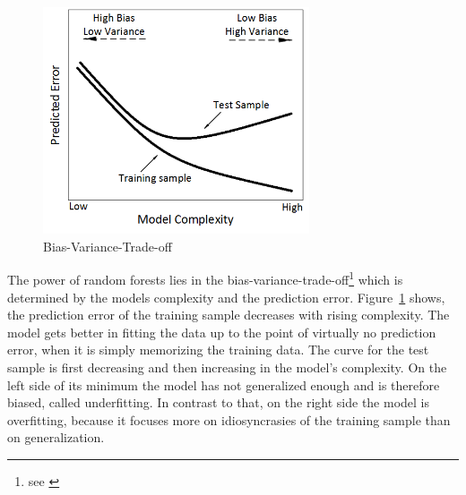 \documentclass[12pt, a4paper, abstract, parskip]{scrartcl}
\theoremstyle{definition}
\begin{document}
\begin{figure}[!ht]
	\centering
	\includegraphics[width=0.7\textwidth]{graphics/biasvariancetradeoff.png}
	\caption{Bias-Variance-Trade-off}
	\label{fig:biasvariancetradeoff}
\end{figure}

The power of random forests lies in the bias-variance-trade-off\footnote{see
\citet[Chapter 2]{friedman2009elements}} which is determined by the models
complexity and the prediction error. Figure~\ref{fig:biasvariancetradeoff}
shows, the prediction error of the training sample decreases with rising
complexity. The model gets better in fitting the data up to the point of
virtually no prediction error, when it is simply memorizing the training data.
The curve for the test sample is first decreasing and then increasing in the
model's complexity. On the left side of its minimum the model has not
generalized enough and is therefore biased, called underfitting. In contrast to
that, on the right side the model is overfitting, because it focuses more on
idiosyncrasies of the training sample than on generalization.

\end{document}
